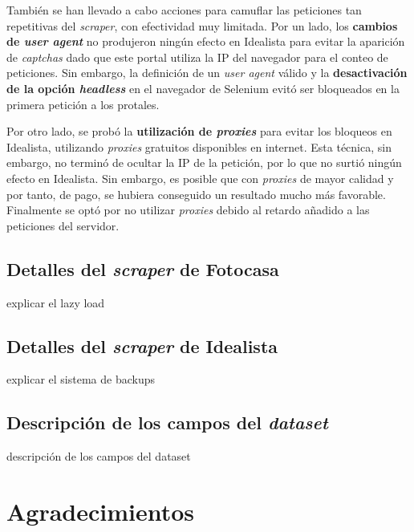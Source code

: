 \documentclass[12pt]{article}
\begin{document}
También se han llevado a cabo acciones para camuflar las peticiones tan repetitivas del \textit{scraper}, con efectividad muy limitada. Por un lado, los \textbf{cambios de \textit{user agent}} no produjeron ningún efecto en Idealista para evitar la aparición de \textit{captchas} dado que este portal utiliza la IP del navegador para el conteo de peticiones. Sin embargo, la definición de un \textit{user agent} válido y la \textbf{desactivación de la opción \textit{headless}} en el navegador de Selenium evitó ser bloqueados en la primera petición a los protales.

Por otro lado, se probó la \textbf{utilización de \textit{proxies}} para evitar los bloqueos en Idealista, utilizando \textit{proxies} gratuitos disponibles en internet. Esta técnica, sin embargo, no terminó de ocultar la IP de la petición, por lo que no surtió ningún efecto en Idealista. Sin embargo, es posible que con \textit{proxies} de mayor calidad y por tanto, de pago, se hubiera conseguido un resultado mucho más favorable. Finalmente se optó por no utilizar \textit{proxies} debido al retardo añadido a las peticiones del servidor.

\vspace{-1.5em}\subsection*{Detalles del \textit{scraper} de Fotocasa}\vspace{-1em}

explicar el lazy load

\vspace{-1.5em}\subsection*{Detalles del \textit{scraper} de Idealista}\vspace{-1em}

explicar el sistema de backups

\vspace{-1.5em}\subsection*{Descripción de los campos del \textit{dataset}}\vspace{-1em}

descripción de los campos del dataset

\newpage
\vspace{-1.5em}\section{Agradecimientos}\vspace{-1.0em}
\end{document}
